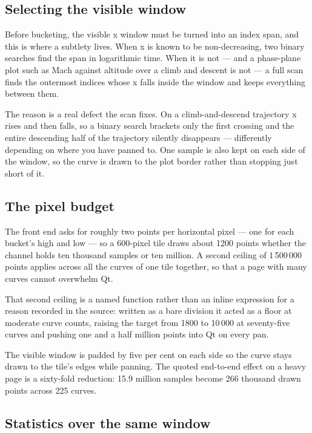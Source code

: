 \documentclass[11pt,a4paper,oneside]{report}
\begin{document}
\subsection{Selecting the visible window}

Before bucketing, the visible x window must be turned into an index span, and
this is where a subtlety lives. When x is known to be non-decreasing, two binary
searches find the span in logarithmic time. When it is not --- and a phase-plane
plot such as Mach against altitude over a climb and descent is not --- a full
scan finds the outermost indices whose x falls inside the window and keeps
everything between them.

The reason is a real defect the scan fixes. On a climb-and-descend trajectory x
rises and then falls, so a binary search brackets only the first crossing and
the entire descending half of the trajectory silently disappears ---
differently depending on where you have panned to. One sample is also kept on
each side of the window, so the curve is drawn to the plot border rather than
stopping just short of it.

\subsection{The pixel budget}

The front end asks for roughly two points per horizontal pixel --- one for each
bucket's high and low --- so a 600-pixel tile draws about 1200 points whether
the channel holds ten thousand samples or ten million. A second ceiling of
1\,500\,000 points applies across all the curves of one tile together, so that a
page with many curves cannot overwhelm Qt.

That second ceiling is a named function rather than an inline expression for a
reason recorded in the source: written as a bare division it acted as a floor at
moderate curve counts, raising the target from 1800 to 10\,000 at seventy-five
curves and pushing one and a half million points into Qt on every pan.

The visible window is padded by five per cent on each side so the curve stays
drawn to the tile's edges while panning. The quoted end-to-end effect on a heavy
page is a sixty-fold reduction: 15.9 million samples become 266 thousand drawn
points across 225 curves.

\subsection{Statistics over the same window}
\end{document}
